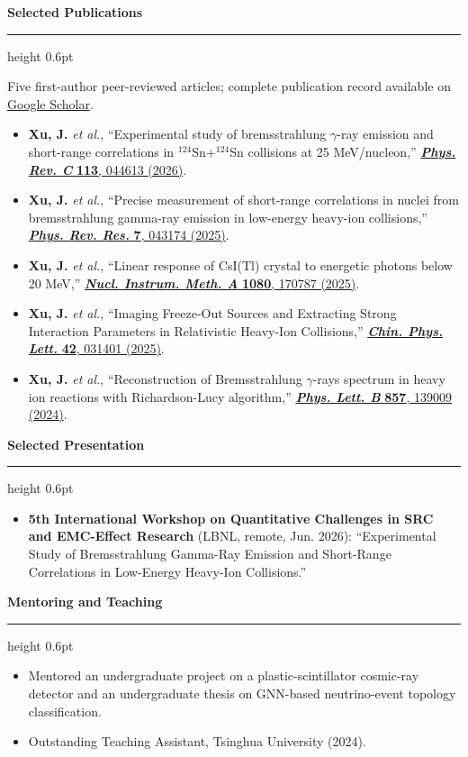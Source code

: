 \documentclass[10pt]{article}
\newcommand{\cvsection}[1]{%
  \vspace{0.75em}
  {\large\bfseries\color{accent} #1}\par
  \vspace{0.2em}
  {\color{rule}\hrule height 0.6pt}
  \vspace{0.45em}
}
\begin{document}
\cvsection{Selected Publications}
{\small Five first-author peer-reviewed articles; complete publication record
available on \href{https://scholar.google.com/citations?user=XK-LVeIAAAAJ\&hl=en}{Google Scholar}.}
\begin{itemize}[leftmargin=1.25em,itemsep=2pt,topsep=3pt]
  \item \textbf{Xu, J.} \textit{et al.}, ``Experimental study of bremsstrahlung $\gamma$-ray emission and short-range correlations in ${}^{124}$Sn+${}^{124}$Sn collisions at 25 MeV/nucleon,'' \href{https://doi.org/10.1103/dhz2-nl56}{\textbf{\textit{Phys. Rev. C}} \textbf{113}, 044613 (2026)}.
  \item \textbf{Xu, J.} \textit{et al.}, ``Precise measurement of short-range correlations in nuclei from bremsstrahlung gamma-ray emission in low-energy heavy-ion collisions,'' \href{https://doi.org/10.1103/jw1p-36pb}{\textbf{\textit{Phys. Rev. Res.}} \textbf{7}, 043174 (2025)}.
  \item \textbf{Xu, J.} \textit{et al.}, ``Linear response of CsI(Tl) crystal to energetic photons below 20 MeV,'' \href{https://doi.org/10.1016/j.nima.2025.170787}{\textbf{\textit{Nucl. Instrum. Meth. A}} \textbf{1080}, 170787 (2025)}.
  \item \textbf{Xu, J.} \textit{et al.}, ``Imaging Freeze-Out Sources and Extracting Strong Interaction Parameters in Relativistic Heavy-Ion Collisions,'' \href{https://doi.org/10.1088/0256-307X/42/3/031401}{\textbf{\textit{Chin. Phys. Lett.}} \textbf{42}, 031401 (2025)}.
  \item \textbf{Xu, J.} \textit{et al.}, ``Reconstruction of Bremsstrahlung $\gamma$-rays spectrum in heavy ion reactions with Richardson-Lucy algorithm,'' \href{https://doi.org/10.1016/j.physletb.2024.139009}{\textbf{\textit{Phys. Lett. B}} \textbf{857}, 139009 (2024)}.
\end{itemize}

\cvsection{Selected Presentation}
\begin{itemize}[leftmargin=1.25em,itemsep=2pt,topsep=2pt]
  \item \textbf{5th International Workshop on Quantitative Challenges in SRC
    and EMC-Effect Research} (LBNL, remote, Jun. 2026): ``Experimental Study of
    Bremsstrahlung Gamma-Ray Emission and Short-Range Correlations in Low-Energy
    Heavy-Ion Collisions.''
\end{itemize}

\cvsection{Mentoring and Teaching}
\begin{itemize}[leftmargin=1.25em,itemsep=2pt,topsep=2pt]
  \item Mentored an undergraduate project on a plastic-scintillator cosmic-ray
    detector and an undergraduate thesis on GNN-based neutrino-event topology
    classification.
  \item Outstanding Teaching Assistant, Tsinghua University (2024).
\end{itemize}
\end{document}
